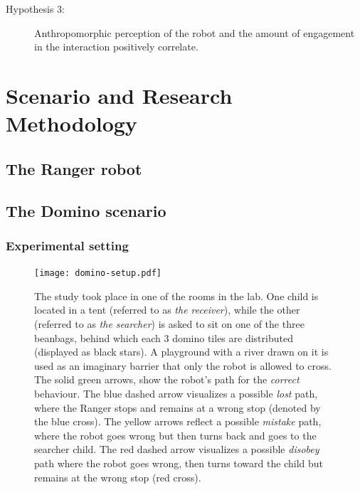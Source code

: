 \documentclass{sig-alternate}
\begin{document}
\begin{description}

    \item[Hypothesis 3:] Anthropomorphic perception of the robot and the amount
    of engagement in the interaction positively correlate.

\end{description}



\section{Scenario and Research Methodology}

\subsection{The Ranger robot}

\subsection{The Domino scenario}

\subsubsection{Experimental setting}

\begin{figure}[ht!] 
    \centering 
    \texttt{[image: domino-setup.pdf]} 
    \caption{\small The study took place in one of the rooms in the lab. One
    child is located in a tent (referred to as \textit{the receiver}), while the
    other (referred to as \textit{the searcher}) is asked to sit on one of the
    three beanbags, behind which each 3 domino tiles are distributed (displayed
    as black stars). A playground with a river drawn on it is used as an
    imaginary barrier that only the robot is allowed to cross. The solid green
    arrows, show the robot's path for the \textit{correct} behaviour. The blue
    dashed arrow visualizes a possible \textit{lost} path, where the Ranger
    stops and remains at a wrong stop (denoted by the blue cross). The yellow
    arrows reflect a possible \textit{mistake} path, where the robot goes wrong
    but then turns back and goes to the searcher child. The red dashed arrow
    visualizes a possible \textit{disobey} path where the robot goes wrong, then
    turns toward the child but remains at the wrong stop (red cross).} 

    \label{fig:domino-setup} 
\end{figure}
\end{document}
